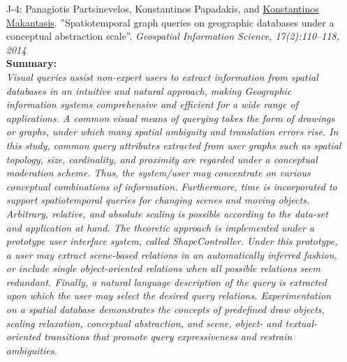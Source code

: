 \documentclass[a4paper,10pt]{article}
\begin{document}
\begin{itemize}
	\item [J-4:]Panagiotis Partsinevelos, Konstantinos Papadakis, and \underline{Konstantinos} \underline{Makantasis}. ''Spatiotemporal graph queries on geographic databases under a conceptual abstraction scale''. \textit{Geospatial Information Science, 17(2):110–118, 2014}\\
	\textbf{Summary:}\\
	\textit{Visual queries assist non-expert users to extract information from spatial databases in an intuitive and natural approach, making Geographic information systems comprehensive and efficient for a wide range of applications. A common visual means of querying takes the form of drawings or graphs, under which many spatial ambiguity and translation errors rise. In this study, common query attributes extracted from user graphs such as spatial topology, size, cardinality, and proximity are regarded under a conceptual moderation scheme. Thus, the system/user may concentrate on various conceptual combinations of information. Furthermore, time is incorporated to support spatiotemporal queries for changing scenes and moving objects. Arbitrary, relative, and absolute scaling is possible according to the data-set and application at hand. The theoretic approach is implemented under a prototype user interface system, called ShapeController. Under this prototype, a user may extract scene-based relations in an automatically inferred fashion, or include single object-oriented relations when all possible relations seem redundant. Finally, a natural language description of the query is extracted upon which the user may select the desired query relations. Experimentation on a spatial database demonstrates the concepts of predefined draw objects, scaling relaxation, conceptual abstraction, and scene, object- and textual-oriented transitions that promote query expressiveness and restrain ambiguities.}
	

\end{itemize}
\end{document}
